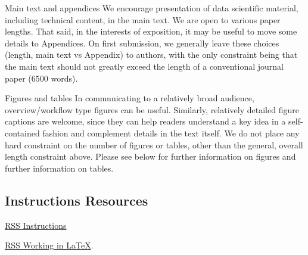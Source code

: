 Main text and appendices
We encourage presentation of data scientific material, including technical content, in the main text. We are open to various paper lengths. That said, in the interests of exposition, it may be useful to move some details to Appendices. On first submission, we generally leave these choices (length, main text vs Appendix) to authors, with the only constraint being that the main text should not greatly exceed the length of a conventional journal paper (6500 words).

Figures and tables
In communicating to a relatively broad audience, overview/workflow type figures can be useful. Similarly, relatively detailed figure captions are welcome, since they can help readers understand a key idea in a self-contained fashion and complement details in the text itself. We do not place any hard constraint on the number of figures or tables, other than the general, overall length constraint above. Please see below for further information on figures and further information on tables.


\subsection{Instructions Resources}

\href{https://academic.oup.com/rssdat/pages/general-instructions}{RSS Instructions} 

\href{https://academic.oup.com/pages/authoring/books/preparing-your-manuscript/working-in-latex}{RSS Working in \LaTeX}.
